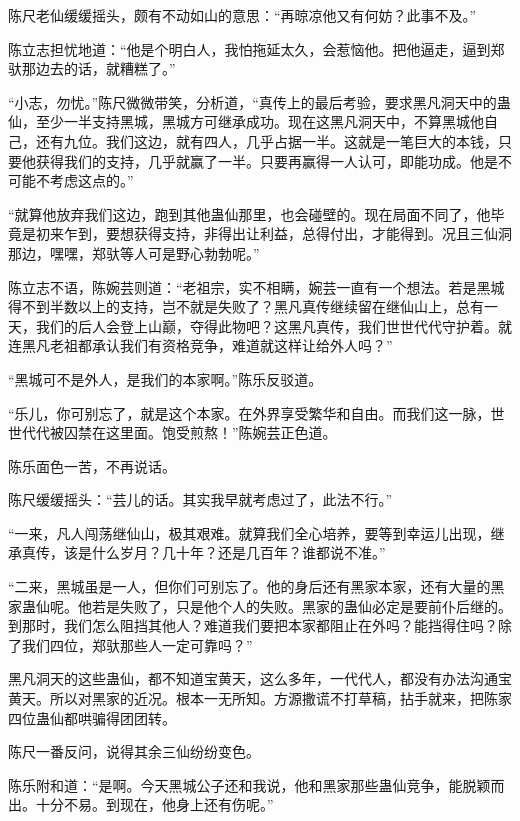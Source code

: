 
\begin{this_body}

陈尺老仙缓缓摇头，颇有不动如山的意思：“再晾凉他又有何妨？此事不及。”

陈立志担忧地道：“他是个明白人，我怕拖延太久，会惹恼他。把他逼走，逼到郑驮那边去的话，就糟糕了。”

“小志，勿忧。”陈尺微微带笑，分析道，“真传上的最后考验，要求黑凡洞天中的蛊仙，至少一半支持黑城，黑城方可继承成功。现在这黑凡洞天中，不算黑城他自己，还有九位。我们这边，就有四人，几乎占据一半。这就是一笔巨大的本钱，只要他获得我们的支持，几乎就赢了一半。只要再赢得一人认可，即能功成。他是不可能不考虑这点的。”

“就算他放弃我们这边，跑到其他蛊仙那里，也会碰壁的。现在局面不同了，他毕竟是初来乍到，要想获得支持，非得出让利益，总得付出，才能得到。况且三仙洞那边，嘿嘿，郑驮等人可是野心勃勃呢。”

陈立志不语，陈婉芸则道：“老祖宗，实不相瞒，婉芸一直有一个想法。若是黑城得不到半数以上的支持，岂不就是失败了？黑凡真传继续留在继仙山上，总有一天，我们的后人会登上山巅，夺得此物吧？这黑凡真传，我们世世代代守护着。就连黑凡老祖都承认我们有资格竞争，难道就这样让给外人吗？”

“黑城可不是外人，是我们的本家啊。”陈乐反驳道。

“乐儿，你可别忘了，就是这个本家。在外界享受繁华和自由。而我们这一脉，世世代代被囚禁在这里面。饱受煎熬！”陈婉芸正色道。

陈乐面色一苦，不再说话。

陈尺缓缓摇头：“芸儿的话。其实我早就考虑过了，此法不行。”

“一来，凡人闯荡继仙山，极其艰难。就算我们全心培养，要等到幸运儿出现，继承真传，该是什么岁月？几十年？还是几百年？谁都说不准。”

“二来，黑城虽是一人，但你们可别忘了。他的身后还有黑家本家，还有大量的黑家蛊仙呢。他若是失败了，只是他个人的失败。黑家的蛊仙必定是要前仆后继的。到那时，我们怎么阻挡其他人？难道我们要把本家都阻止在外吗？能挡得住吗？除了我们四位，郑驮那些人一定可靠吗？”

黑凡洞天的这些蛊仙，都不知道宝黄天，这么多年，一代代人，都没有办法沟通宝黄天。所以对黑家的近况。根本一无所知。方源撒谎不打草稿，拈手就来，把陈家四位蛊仙都哄骗得团团转。

陈尺一番反问，说得其余三仙纷纷变色。

陈乐附和道：“是啊。今天黑城公子还和我说，他和黑家那些蛊仙竞争，能脱颖而出。十分不易。到现在，他身上还有伤呢。”


\end{this_body}
